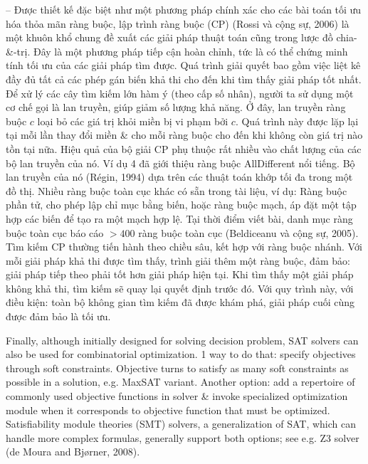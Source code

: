 \documentclass{article}
\begin{document}
\begin{itemize}
\begin{itemize}
\begin{itemize}
\begin{itemize}
                -- Được thiết kế đặc biệt như một phương pháp chính xác cho các bài toán tối ưu hóa thỏa mãn ràng buộc, lập trình ràng buộc (CP) (Rossi và cộng sự, 2006) là một khuôn khổ chung đề xuất các giải pháp thuật toán cũng trong lược đồ chia-\&-trị. Đây là một phương pháp tiếp cận hoàn chỉnh, tức là có thể chứng minh tính tối ưu của các giải pháp tìm được. Quá trình giải quyết bao gồm việc liệt kê đầy đủ tất cả các phép gán biến khả thi cho đến khi tìm thấy giải pháp tốt nhất. Để xử lý các cây tìm kiếm lớn hàm ý (theo cấp số nhân), người ta sử dụng một cơ chế gọi là lan truyền, giúp giảm số lượng khả năng. Ở đây, lan truyền ràng buộc $c$ loại bỏ các giá trị khỏi miền bị vi phạm bởi $c$. Quá trình này được lặp lại tại mỗi lần thay đổi miền \& cho mỗi ràng buộc cho đến khi không còn giá trị nào tồn tại nữa. Hiệu quả của bộ giải CP phụ thuộc rất nhiều vào chất lượng của các bộ lan truyền của nó. Ví dụ 4 đã giới thiệu ràng buộc AllDifferent nổi tiếng. Bộ lan truyền của nó (Régin, 1994) dựa trên các thuật toán khớp tối đa trong một đồ thị. Nhiều ràng buộc toàn cục khác có sẵn trong tài liệu, ví dụ: Ràng buộc phần tử, cho phép lập chỉ mục bằng biến, hoặc ràng buộc mạch, áp đặt một tập hợp các biến để tạo ra một mạch hợp lệ. Tại thời điểm viết bài, danh mục ràng buộc toàn cục báo cáo $> 400$ ràng buộc toàn cục (Beldiceanu và cộng sự, 2005). Tìm kiếm CP thường tiến hành theo chiều sâu, kết hợp với ràng buộc nhánh. Với mỗi giải pháp khả thi được tìm thấy, trình giải thêm một ràng buộc, đảm bảo: giải pháp tiếp theo phải tốt hơn giải pháp hiện tại. Khi tìm thấy một giải pháp không khả thi, tìm kiếm sẽ quay lại quyết định trước đó. Với quy trình này, với điều kiện: toàn bộ không gian tìm kiếm đã được khám phá, giải pháp cuối cùng được đảm bảo là tối ưu.

                Finally, although initially designed for solving decision problem, SAT solvers can also be used for combinatorial optimization. 1 way to do that: specify objectives through soft constraints. Objective turns to satisfy as many soft constraints as possible in a solution, e.g. MaxSAT variant. Another option: add a repertoire of commonly used objective functions in solver \& invoke specialized optimization module when it corresponds to objective function that must be optimized. Satisfiability module theories (SMT) solvers, a generalization of SAT, which can handle more complex formulas, generally support both options; see e.g. Z3 solver (de Moura and Bjørner, 2008).


\end{itemize}
\end{itemize}
\end{itemize}
\end{itemize}
\end{document}

